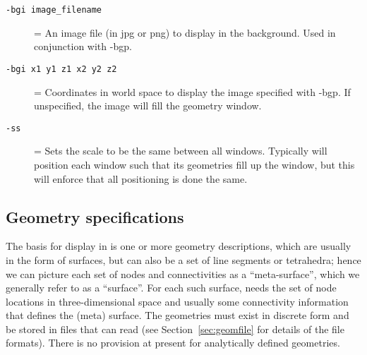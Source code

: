 \begin{description}
  \item[{\tt -bgi image\_filename}] = An image file (in jpg or png) to
        display in the background.  Used in conjunction with -bgp.
  \item[{\tt -bgi x1 y1 z1 x2 y2 z2}] = Coordinates in world space to display
        the image specified with -bgp.  If unspecified, the image will fill the
        geometry window.
  \item[{\tt -ss}] = Sets the scale to be the same between all windows.  Typically
        \map{} will position each window such that its geometries fill up the window, 
        but this will enforce that all positioning is done the same.


\end{description}
        
\subsection{Geometry specifications}
\label{sec:usage-geometry} 


The basis for display in \map{} is one or more geometry descriptions,
which are usually in the form of surfaces, but can also be a set of line
segments or tetrahedra; hence we can picture each set of nodes and
connectivities as a ``meta-surface'', which we generally refer to as a
``surface''.  For each such surface, \map{} needs the set of node locations
in three-dimensional space and usually some connectivity information that
defines the (meta) surface.  The geometries must exist in discrete form and
be stored in files that \map{} can read (see Section~\ref{sec:geomfile} for
details of the file formats).  There is no provision at present for
analytically defined geometries.

